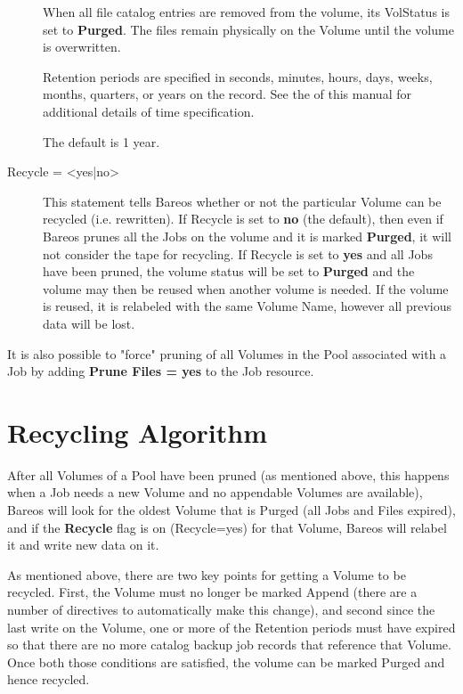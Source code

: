 \begin{description}
   When all file catalog entries are removed from the volume,  its VolStatus is
   set to {\bf Purged}. The files remain physically  on the Volume until the
   volume is overwritten.

   Retention periods are specified in seconds,  minutes, hours, days, weeks,
   months,  quarters, or years on the record. See the
    of this  manual for
   additional details of time specification.

The default is 1 year.

\item [Recycle = {\textless}yes|no{\textgreater}]
   This statement tells Bareos whether or not the particular Volume can be
   recycled (i.e.  rewritten).  If Recycle is set to {\bf no} (the
   default), then even if Bareos prunes all the Jobs on the volume and it
   is marked {\bf Purged}, it will not consider the tape for recycling.  If
   Recycle is set to {\bf yes} and all Jobs have been pruned, the volume
   status will be set to {\bf Purged} and the volume may then be reused
   when another volume is needed.  If the volume is reused, it is relabeled
   with the same Volume Name, however all previous data will be lost.
   \end{description}

   It is also possible to "force" pruning of all Volumes in the Pool
   associated with a Job by adding {\bf Prune Files = yes} to the Job resource.

\label{Recycling}
\label{RecyclingAlgorithm}
\section{Recycling Algorithm}

After all Volumes of a Pool have been pruned (as mentioned above, this happens
when a Job needs a new Volume and no appendable Volumes are available), Bareos
will look for the oldest Volume that is Purged (all Jobs and Files expired),
and if the {\bf Recycle} flag is on (Recycle=yes) for that Volume, Bareos will
relabel it and write new data on it.

As mentioned above, there are two key points for getting a Volume
to be recycled. First, the Volume must no longer be marked Append (there
are a number of directives to automatically make this change), and second
since the last write on the Volume, one or more of the Retention periods
must have expired so that there are no more catalog backup job records
that reference that Volume.  Once both those conditions are satisfied,
the volume can be marked Purged and hence recycled.

